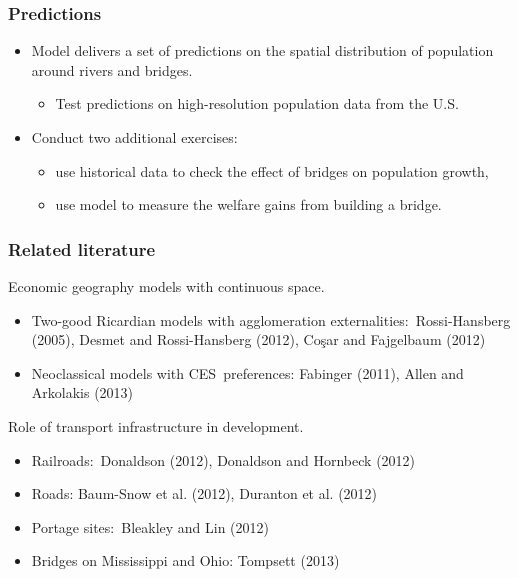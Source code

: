 \documentclass[compress,mathserif]{beamer}
\begin{document}
\begin{frame}\frametitle{Predictions}
\begin{itemize}
\item Model delivers a set of predictions on the spatial distribution of
population around rivers and bridges.

\begin{itemize}
\item Test predictions on high-resolution population data from the U.S.
\end{itemize}

\item Conduct two additional exercises:

\begin{itemize}
\item use historical data to check the effect of bridges on population
growth,

\item use model to measure the welfare gains from building a bridge.
\end{itemize}
\end{itemize}

\end{frame}%
\begin{frame}%

\frametitle{Related literature}

Economic geography models with continuous space.

\begin{itemize}
\item Two-good Ricardian models with agglomeration externalities:\
Rossi-Hansberg (2005), Desmet and Rossi-Hansberg (2012),\newline
Co\c{s}ar and Fajgelbaum (2012)

\item Neoclassical models with CES\ preferences:\newline
Fabinger (2011), Allen and Arkolakis (2013)\bigskip
\end{itemize}

Role of transport infrastructure in development.

\begin{itemize}
\item Railroads:\ Donaldson (2012), Donaldson and Hornbeck (2012)

\item Roads: Baum-Snow et al. (2012), Duranton et al. (2012)

\item Portage sites:\ Bleakley and Lin (2012)

\item Bridges on Mississippi and Ohio: Tompsett (2013)
\end{itemize}

\end{frame}%
\end{document}
